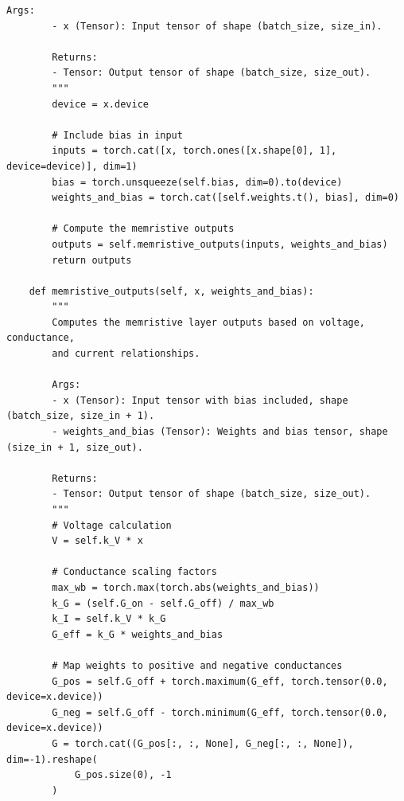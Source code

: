 \begin{lstlisting}[caption={mnn\_torch/layers.py},label={lst:mnn-src-layers}]
        Args:
        - x (Tensor): Input tensor of shape (batch_size, size_in).

        Returns:
        - Tensor: Output tensor of shape (batch_size, size_out).
        """
        device = x.device

        # Include bias in input
        inputs = torch.cat([x, torch.ones([x.shape[0], 1], device=device)], dim=1)
        bias = torch.unsqueeze(self.bias, dim=0).to(device)
        weights_and_bias = torch.cat([self.weights.t(), bias], dim=0)

        # Compute the memristive outputs
        outputs = self.memristive_outputs(inputs, weights_and_bias)
        return outputs

    def memristive_outputs(self, x, weights_and_bias):
        """
        Computes the memristive layer outputs based on voltage, conductance,
        and current relationships.

        Args:
        - x (Tensor): Input tensor with bias included, shape (batch_size, size_in + 1).
        - weights_and_bias (Tensor): Weights and bias tensor, shape (size_in + 1, size_out).

        Returns:
        - Tensor: Output tensor of shape (batch_size, size_out).
        """
        # Voltage calculation
        V = self.k_V * x

        # Conductance scaling factors
        max_wb = torch.max(torch.abs(weights_and_bias))
        k_G = (self.G_on - self.G_off) / max_wb
        k_I = self.k_V * k_G
        G_eff = k_G * weights_and_bias

        # Map weights to positive and negative conductances
        G_pos = self.G_off + torch.maximum(G_eff, torch.tensor(0.0, device=x.device))
        G_neg = self.G_off - torch.minimum(G_eff, torch.tensor(0.0, device=x.device))
        G = torch.cat((G_pos[:, :, None], G_neg[:, :, None]), dim=-1).reshape(
            G_pos.size(0), -1
        )


\end{lstlisting}
